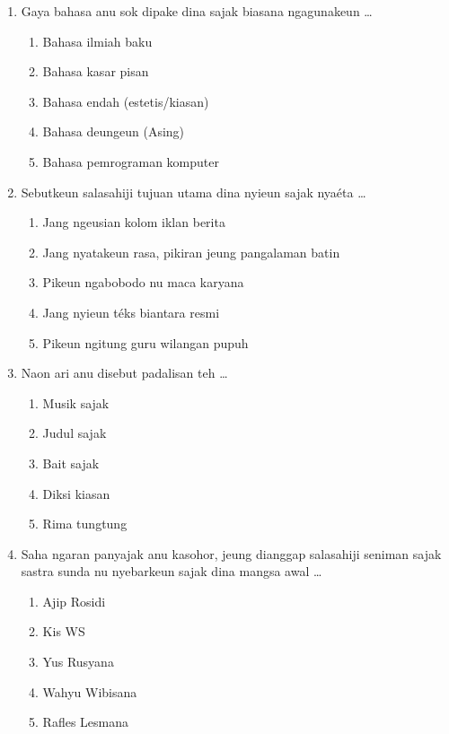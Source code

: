 \documentclass[12pt,a4paper]{article}
\begin{document}
\begin{enumerate}[leftmargin=*]
\item Gaya bahasa anu sok dipake dina sajak biasana ngagunakeun \dots
    \begin{enumerate}[label=\alph*.]
        \item Bahasa ilmiah baku
        \item Bahasa kasar pisan
        \item Bahasa endah (estetis/kiasan)
        \item Bahasa deungeun (Asing)
        \item Bahasa pemrograman komputer
    \end{enumerate}

\item Sebutkeun salasahiji tujuan utama dina nyieun sajak nyaéta \dots
    \begin{enumerate}[label=\alph*.]
        \item Jang ngeusian kolom iklan berita
        \item Jang nyatakeun rasa, pikiran jeung pangalaman batin
        \item Pikeun ngabobodo nu maca karyana
        \item Jang nyieun téks biantara resmi
        \item Pikeun ngitung guru wilangan pupuh
    \end{enumerate}

\item Naon ari anu disebut padalisan teh \dots
    \begin{enumerate}[label=\alph*.]
        \item Musik sajak
        \item Judul sajak
        \item Bait sajak
        \item Diksi kiasan
        \item Rima tungtung
    \end{enumerate}

\item Saha ngaran panyajak anu kasohor, jeung dianggap salasahiji seniman sajak sastra sunda nu nyebarkeun sajak dina mangsa awal \dots
    \begin{enumerate}[label=\alph*.]
        \item Ajip Rosidi
        \item Kis WS
        \item Yus Rusyana
        \item Wahyu Wibisana
        \item Rafles Lesmana
    \end{enumerate}


\end{enumerate}
\end{document}
